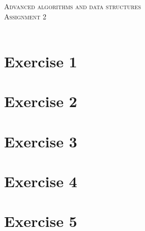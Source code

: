 \documentclass{article}
\begin{document}
\begin{center}
\textsc{\Large Advanced algorithms and data structures}\\[0.5cm]
\textsc{\large Assignment 2}\\[0.5cm]
\textsc{\large }\\[0.5cm]
\vspace{1 cm}
\end{center}

\section*{Exercise 1}


\newpage
\section*{Exercise 2}

\section*{Exercise 3}


\newpage
\section*{Exercise 4}



\newpage
\section*{Exercise 5}

\end{document}
